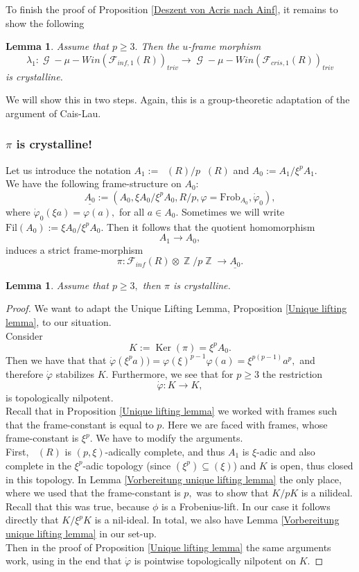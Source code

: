 \documentclass[a4paper,10,5 pt]{amsart}
\newtheorem{Lemma}[Satz]{Lemma}
\theoremstyle{definition}
\DeclareMathOperator{\Ainf}{\mathbb{A}_{inf}}
\DeclareMathOperator{\Ker}{Ker}
\DeclareMathOperator{\G}{\mathcal{G}}
\DeclareMathOperator{\Z}{\mathbb{Z}}
\begin{document}
To finish the proof of Proposition \ref{Deszent von Acris nach Ainf}, it remains to show the following
\begin{Lemma}
Assume that $p\geq 3.$ Then the $u$-frame morphism
$$
\lambda_{1}\colon \G-\mu-Win(\mathcal{F}_{inf,1}(R))_{triv}\rightarrow \G-\mu-Win(\mathcal{F}_{cris,1}(R))_{triv}
$$
is crystalline.
\end{Lemma}
We will show this in two steps. Again, this is a group-theoretic adaptation of the argument of Cais-Lau.
\subsubsection{$\pi$ is crystalline!}
Let us introduce the notation $A_{1}:=\Ainf(R)/p\Ainf(R)$ and $A_{0}:=A_{1}/\xi^{p}A_{1}.$
\\
We have the following frame-structure on $A_{0}$:
$$\underline{A_{0}}:=(A_{0},\xi A_{0}/\xi^{p}A_{0},R/p,\varphi=\text{Frob}_{A_{0}},\dot{\varphi}_{0}),$$
where $\dot{\varphi}_{0}(\xi a)=\varphi(a),$ for all $a\in A_{0}.$ Sometimes we will write $\text{Fil}(A_{0}):=\xi A_{0}/\xi^{p}A_{0}.$ Then it follows that the quotient homomorphism
$$A_{1}\rightarrow A_{0},$$
induces a strict frame-morphism
$$\pi\colon \mathcal{F}_{inf}(R) \otimes \Z /p\Z \rightarrow \underline{A_{0}}.$$
\begin{Lemma}
Assume that $p\geq 3,$ then $\pi$ is crystalline.
\end{Lemma}
\begin{proof}
We want to adapt the Unique Lifting Lemma, Proposition \ref{Unique lifting lemma}, to our situation.
\\
Consider
$$K:=\Ker(\pi)=\xi^{p}A_{0}.$$
Then we have that that  $\dot{\varphi}(\xi^{p}a))=\varphi(\xi)^{p-1}\varphi(a)=\xi^{p(p-1)}a^{p},$ and therefore $\dot{\varphi}$ stabilizes $K.$ Furthermore, we see that for $p\geq 3$ the restriction
$$\dot{\varphi}\colon K\rightarrow K,$$
is topologically nilpotent.
\\
Recall that in Proposition \ref{Unique lifting lemma} we worked with frames such that the frame-constant is equal to $p.$ Here we are faced with frames, whose frame-constant is $\xi^{p}$. We have to modify the arguments.
\\
First, $\Ainf(R)$ is $(p,\xi)$-adically complete, and thus $A_{1}$ is $\xi$-adic and also complete in the $\xi^{p}$-adic topology (since $(\xi^{p})\subseteq (\xi)$) and $K$ is open, thus closed in this topology. In Lemma \ref{Vorbereitung unique lifting lemma} the only place, where we used that the frame-constant is $p,$ was to show that $K/pK$ is a nilideal. Recall that this was true, because $\phi$ is a Frobenius-lift. In our case it follows directly that $K/\xi^{p}K$ is a nil-ideal. In total, we also have Lemma \ref{Vorbereitung unique lifting lemma} in our set-up.
\\
Then in the proof of Proposition \ref{Unique lifting lemma} the same arguments work, using in the end that $\dot{\varphi}$ is pointwise topologically nilpotent on $K.$
\end{proof}
\end{document}
